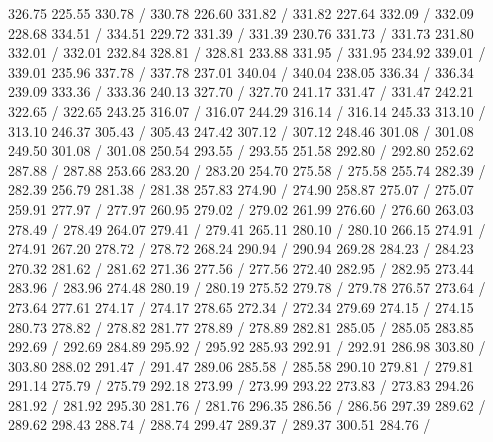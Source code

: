 { 326.75 225.55 330.78 /
 330.78 226.60 331.82 /
 331.82 227.64 332.09 /
 332.09 228.68 334.51 /
 334.51 229.72 331.39 /
 331.39 230.76 331.73 /
 331.73 231.80 332.01 /
 332.01 232.84 328.81 /
 328.81 233.88 331.95 /
 331.95 234.92 339.01 /
 339.01 235.96 337.78 /
 337.78 237.01 340.04 /
 340.04 238.05 336.34 /
 336.34 239.09 333.36 /
 333.36 240.13 327.70 /
 327.70 241.17 331.47 /
 331.47 242.21 322.65 /
 322.65 243.25 316.07 /
 316.07 244.29 316.14 /
 316.14 245.33 313.10 /
 313.10 246.37 305.43 /
 305.43 247.42 307.12 /
 307.12 248.46 301.08 /
 301.08 249.50 301.08 /
 301.08 250.54 293.55 /
 293.55 251.58 292.80 /
 292.80 252.62 287.88 /
 287.88 253.66 283.20 /
 283.20 254.70 275.58 /
 275.58 255.74 282.39 /
 282.39 256.79 281.38 /
 281.38 257.83 274.90 /
 274.90 258.87 275.07 /
 275.07 259.91 277.97 /
 277.97 260.95 279.02 /
 279.02 261.99 276.60 /
 276.60 263.03 278.49 /
 278.49 264.07 279.41 /
 279.41 265.11 280.10 /
 280.10 266.15 274.91 /
 274.91 267.20 278.72 /
 278.72 268.24 290.94 /
 290.94 269.28 284.23 /
 284.23 270.32 281.62 /
 281.62 271.36 277.56 /
 277.56 272.40 282.95 /
 282.95 273.44 283.96 /
 283.96 274.48 280.19 /
 280.19 275.52 279.78 /
 279.78 276.57 273.64 /
 273.64 277.61 274.17 /
 274.17 278.65 272.34 /
 272.34 279.69 274.15 /
 274.15 280.73 278.82 /
 278.82 281.77 278.89 /
 278.89 282.81 285.05 /
 285.05 283.85 292.69 /
 292.69 284.89 295.92 /
 295.92 285.93 292.91 /
 292.91 286.98 303.80 /
 303.80 288.02 291.47 /
 291.47 289.06 285.58 /
 285.58 290.10 279.81 /
 279.81 291.14 275.79 /
 275.79 292.18 273.99 /
 273.99 293.22 273.83 /
 273.83 294.26 281.92 /
 281.92 295.30 281.76 /
 281.76 296.35 286.56 /
 286.56 297.39 289.62 /
 289.62 298.43 288.74 /
 288.74 299.47 289.37 /
 289.37 300.51 284.76 /
}
